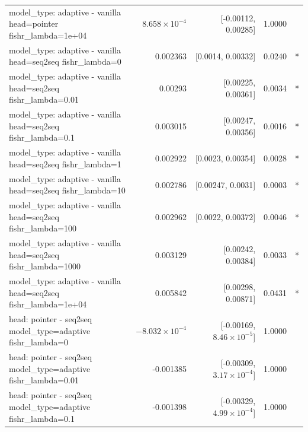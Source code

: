 \documentclass[10pt]{article}
\makeatletter
\newcommand{\stackcell}[1]{\begin{tabular}[t]{@{}l@{}}#1\end{tabular}}
\makeatother
\begin{document}
{\begin{longtable}{lrrrl}
\stackcell{model\_type: adaptive - vanilla\\\footnotesize head=pointer fishr\_lambda=1e+04 } & $8.658\times10^{-4}$ & [-0.00112, 0.00285] & 1.0000 & \\
\stackcell{model\_type: adaptive - vanilla\\\footnotesize head=seq2seq fishr\_lambda=0 } & 0.002363 & [0.0014, 0.00332] & 0.0240 & *\\
\stackcell{model\_type: adaptive - vanilla\\\footnotesize head=seq2seq fishr\_lambda=0.01 } & 0.00293 & [0.00225, 0.00361] & 0.0034 & *\\
\stackcell{model\_type: adaptive - vanilla\\\footnotesize head=seq2seq fishr\_lambda=0.1 } & 0.003015 & [0.00247, 0.00356] & 0.0016 & *\\
\stackcell{model\_type: adaptive - vanilla\\\footnotesize head=seq2seq fishr\_lambda=1 } & 0.002922 & [0.0023, 0.00354] & 0.0028 & *\\
\stackcell{model\_type: adaptive - vanilla\\\footnotesize head=seq2seq fishr\_lambda=10 } & 0.002786 & [0.00247, 0.0031] & 0.0003 & *\\
\stackcell{model\_type: adaptive - vanilla\\\footnotesize head=seq2seq fishr\_lambda=100 } & 0.002962 & [0.0022, 0.00372] & 0.0046 & *\\
\stackcell{model\_type: adaptive - vanilla\\\footnotesize head=seq2seq fishr\_lambda=1000 } & 0.003129 & [0.00242, 0.00384] & 0.0033 & *\\
\stackcell{model\_type: adaptive - vanilla\\\footnotesize head=seq2seq fishr\_lambda=1e+04 } & 0.005842 & [0.00298, 0.00871] & 0.0431 & *\\
\stackcell{head: pointer - seq2seq\\\footnotesize model\_type=adaptive fishr\_lambda=0 } & $-8.032\times10^{-4}$ & [-0.00169, $8.46\times10^{-5}$] & 1.0000 & \\
\stackcell{head: pointer - seq2seq\\\footnotesize model\_type=adaptive fishr\_lambda=0.01 } & -0.001385 & [-0.00309, $3.17\times10^{-4}$] & 1.0000 & \\
\stackcell{head: pointer - seq2seq\\\footnotesize model\_type=adaptive fishr\_lambda=0.1 } & -0.001398 & [-0.00329, $4.99\times10^{-4}$] & 1.0000 & \\

\end{longtable}}
\end{document}
